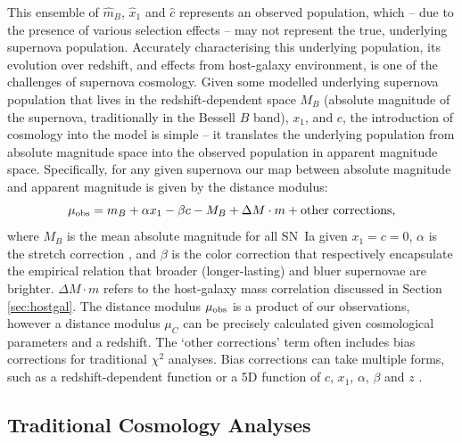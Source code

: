 \documentclass[a4paper,fleqn,usenatbib,manuscript]{emulateapj}
\begin{document}
This ensemble of $\hat{m}_B$, $\hat{x}_1$ and $\hat{c}$ represents an observed population, which -- due to the presence of various selection effects -- may not represent the true, underlying supernova population. Accurately characterising this underlying population, its evolution over redshift, and effects from host-galaxy environment, is one of the challenges of supernova cosmology. Given some modelled underlying supernova population that lives in the redshift-dependent space $M_B$ (absolute magnitude of the supernova, traditionally in the Bessell $B$ band), $x_1$, and $c$, the introduction of cosmology into the model is simple -- it translates the underlying population from absolute magnitude space into the observed population in apparent magnitude space. Specifically, for any given supernova our map between absolute magnitude and apparent magnitude is given by the distance modulus:
\begin{equation}
\mu_{\rm obs} = m_B + \alpha x_1 - \beta c - M_B + \Delta M \cdot m + \text{other corrections}, \label{eq:standard}
\end{equation}
where $M_B$ is the mean absolute magnitude for all SN~Ia given $x_1=c=0$,  $\alpha$ is the stretch correction \citep{Phillips1993, Phillips1999}, and $\beta$ is the color correction \citep{Tripp1998} that respectively encapsulate the empirical relation that broader (longer-lasting) and bluer supernovae are brighter. $\Delta M \cdot m$ refers to the host-galaxy mass correlation discussed in Section \ref{sec:hostgal}. The distance modulus $\mu_{\rm obs}$ is a product of our observations, however a distance modulus $\mu_C$ can be precisely calculated given cosmological parameters and a redshift. The `$\text{other corrections}$' term often includes bias corrections for traditional $\chi^2$ analyses. Bias corrections can take multiple forms, such as a redshift-dependent function \citep{Betoule2014} or a 5D function of $c$, $x_1$, $\alpha$, $\beta$ and $z$ \citep{Kessler2017, Scolnic2017}.


\subsection{Traditional Cosmology Analyses} \label{sec:traditional}
\end{document}
